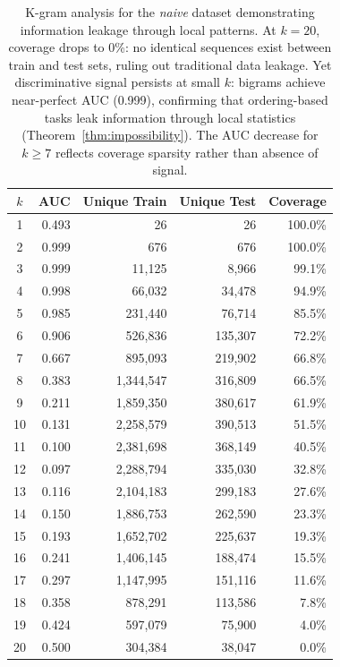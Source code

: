 \documentclass{article}
\theoremstyle{plain}
\theoremstyle{definition}
\theoremstyle{remark}
\begin{document}
\begin{table}[h]
\centering
\caption{K-gram analysis for the \textit{naive} dataset demonstrating information leakage through local patterns. At $k=20$, coverage drops to 0\%: no identical sequences exist between train and test sets, ruling out traditional data leakage. Yet discriminative signal persists at small $k$: bigrams achieve near-perfect AUC (0.999), confirming that ordering-based tasks leak information through local statistics (Theorem~\ref{thm:impossibility}). The AUC decrease for $k \geq 7$ reflects coverage sparsity rather than absence of signal.}
\label{tab:ngram_naive}
\small
\begin{tabular}{crrrr}
\toprule
$k$ & AUC & Unique Train & Unique Test & Coverage \\
\midrule
1 & 0.493 & 26 & 26 & 100.0\% \\
2 & 0.999 & 676 & 676 & 100.0\% \\
3 & 0.999 & 11,125 & 8,966 & 99.1\% \\
4 & 0.998 & 66,032 & 34,478 & 94.9\% \\
5 & 0.985 & 231,440 & 76,714 & 85.5\% \\
6 & 0.906 & 526,836 & 135,307 & 72.2\% \\
7 & 0.667 & 895,093 & 219,902 & 66.8\% \\
8 & 0.383 & 1,344,547 & 316,809 & 66.5\% \\
9 & 0.211 & 1,859,350 & 380,617 & 61.9\% \\
10 & 0.131 & 2,258,579 & 390,513 & 51.5\% \\
11 & 0.100 & 2,381,698 & 368,149 & 40.5\% \\
12 & 0.097 & 2,288,794 & 335,030 & 32.8\% \\
13 & 0.116 & 2,104,183 & 299,183 & 27.6\% \\
14 & 0.150 & 1,886,753 & 262,590 & 23.3\% \\
15 & 0.193 & 1,652,702 & 225,637 & 19.3\% \\
16 & 0.241 & 1,406,145 & 188,474 & 15.5\% \\
17 & 0.297 & 1,147,995 & 151,116 & 11.6\% \\
18 & 0.358 & 878,291 & 113,586 & 7.8\% \\
19 & 0.424 & 597,079 & 75,900 & 4.0\% \\
20 & 0.500 & 304,384 & 38,047 & 0.0\% \\
\bottomrule
\end{tabular}
\end{table}
\end{document}
